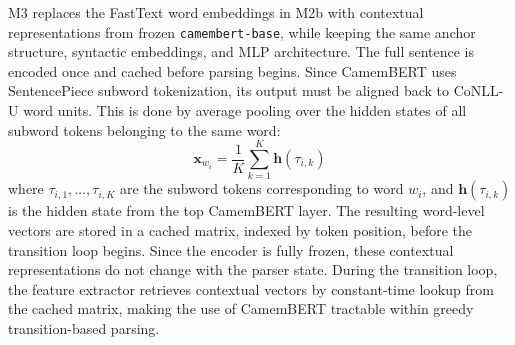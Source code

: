 \documentclass[12pt,letterpaper]{article}
\begin{document}
M3 replaces the FastText word embeddings in M2b with contextual representations from frozen \texttt{camembert-base}, while keeping the same anchor structure, syntactic embeddings, and MLP architecture. The full sentence is encoded once and cached before parsing begins. Since CamemBERT uses SentencePiece subword tokenization, its output must be aligned back to CoNLL-U word units. This is done by average pooling over the hidden states of all subword tokens belonging to the same word:
\begin{equation}
\mathbf{x}_{w_i} = \frac{1}{K} \sum_{k=1}^{K} \mathbf{h}(\tau_{i,k})
\end{equation}
where $\tau_{i,1}, \dots, \tau_{i,K}$ are the subword tokens corresponding to word $w_i$, and $\mathbf{h}(\tau_{i,k})$ is the hidden state from the top CamemBERT layer. The resulting word-level vectors are stored in a cached matrix, indexed by token position, before the transition loop begins. Since the encoder is fully frozen, these contextual representations do not change with the parser state. During the transition loop, the feature extractor retrieves contextual vectors by constant-time lookup from the cached matrix, making the use of CamemBERT tractable within greedy transition-based parsing.
\begin{table}[ht]
\centering
\caption{Overview of the six model configurations evaluated in this study.}
\label{tab:model_overview}
\end{table}
\end{document}
